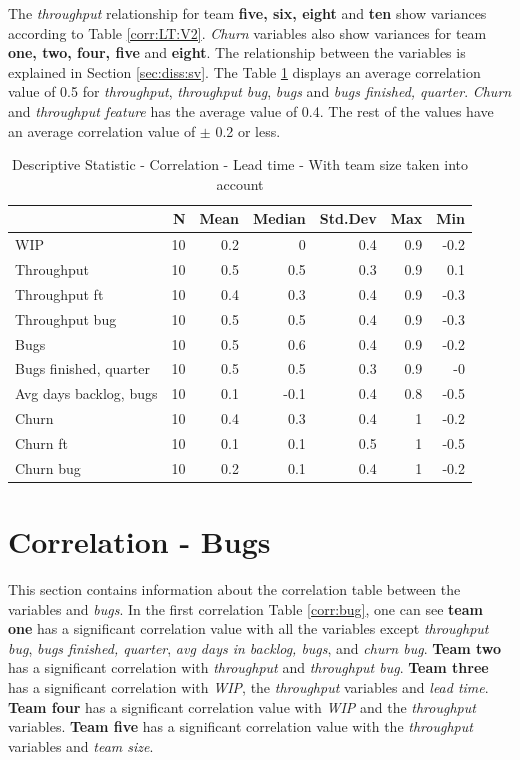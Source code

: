 \documentclass[UKenglish]{ifimaster}  %
\begin{document}
The \textit{throughput} relationship for team \textbf{five, six, eight} and \textbf{ten} show variances according to Table \ref{corr:LT:V2}. \textit{Churn} variables also show variances for team \textbf{one, two, four, five} and \textbf{eight}. The relationship between the variables is  explained in Section \ref{sec:diss:sv}.
The Table \ref{DS:corr:LT:v2} displays an average correlation value of 0.5 for  \textit{throughput}, \textit{throughput bug}, \textit{bugs} and \textit{bugs finished, quarter}. \textit{Churn} and \textit{throughput feature} has the average value of 0.4. The rest of the values have an average correlation value of $\pm$ 0.2 or less.



\begin{table}[H]
 \centering
 \begin{tabular}{ | l | r | r | r | r | r | r | }
 \hline
& \bf{N} & \bf{Mean} & \bf{Median} & \bf{Std.Dev} & \bf{Max} & \bf{Min} \\ \hline
WIP  & 10 & 0.2 & 0 & 0.4 & 0.9 & -0.2\\ \hline
Throughput  & 10 & 0.5 & 0.5 & 0.3 & 0.9 & 0.1\\ \hline
Throughput ft  & 10 & 0.4 & 0.3 & 0.4 & 0.9 & -0.3\\ \hline
Throughput bug  & 10 & 0.5 & 0.5 & 0.4 & 0.9 & -0.3\\ \hline
Bugs  & 10 & 0.5 & 0.6 & 0.4 & 0.9 & -0.2\\ \hline
Bugs finished, quarter  & 10 & 0.5 & 0.5 & 0.3 & 0.9 & -0\\ \hline
Avg days backlog, bugs  & 10 & 0.1 & -0.1 & 0.4 & 0.8 & -0.5\\ \hline
Churn  & 10 & 0.4 & 0.3 & 0.4 & 1 & -0.2\\ \hline
Churn ft  & 10 & 0.1 & 0.1 & 0.5 & 1 & -0.5\\ \hline
Churn bug  & 10 & 0.2 & 0.1 & 0.4 & 1 & -0.2 \\ \hline
\end{tabular}
 \caption{Descriptive Statistic - Correlation - Lead time - With team size taken into account}
 \label{DS:corr:LT:v2}
 \end{table}


\section{Correlation - Bugs}
\label{sec:corr:bug}
This section contains information about the correlation table between the variables and \textit{bugs}. In the first correlation 
Table \ref{corr:bug}, one can see \textbf{team one} has a significant correlation value with all the variables except \textit{throughput bug}, \textit{bugs finished, quarter}, \textit{avg days in backlog, bugs}, and \textit{churn bug}. \textbf{Team two} has a significant correlation with \textit{throughput} and \textit{throughput bug}. \textbf{Team three} has a significant correlation with \textit{WIP}, the \textit{throughput} variables and \textit{lead time}. \textbf{Team four} has a significant correlation value with \textit{WIP} and the \textit{throughput} variables. \textbf{Team five} has a significant correlation value with the \textit{throughput} variables and \textit{team size}. 
\end{document}
